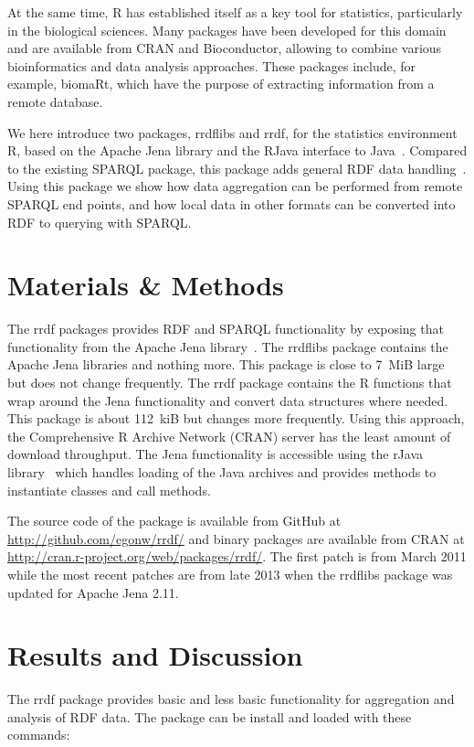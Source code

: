 \documentclass[12pt]{article}
\begin{document}
At the same time, R has established itself as a key tool for statistics, particularly in the biological
sciences. Many packages have been developed for this domain and are available from CRAN and Bioconductor,
allowing to combine various bioinformatics and data analysis approaches. These packages include,
for example, biomaRt, which have the purpose of extracting information from a remote database.

We here introduce two packages, rrdflibs and rrdf, for the statistics environment R, based on the Apache
Jena library and the RJava interface to Java~\cite{RMan,Jena,RJava}. Compared to the existing SPARQL
package, this package adds general RDF data handling~\cite{VanHage2013}. Using this package we show how
data aggregation can be performed from remote SPARQL end points, and how local data in other formats
can be converted into RDF to querying with SPARQL.

\section{Materials \& Methods}

The rrdf packages provides RDF and SPARQL functionality by exposing that functionality from the
Apache Jena library~\cite{Jena}. The rrdflibs package contains the Apache Jena libraries and
nothing more. This package is close to 7~MiB large but does not change frequently. The rrdf
package contains the R functions that wrap around the Jena functionality and convert data structures
where needed. This package is about 112~kiB but changes more frequently. Using this approach,
the Comprehensive R Archive Network (CRAN) server has the least amount of download throughput.
The Jena functionality is accessible using the rJava library~\cite{RJava} which handles loading
of the Java archives and provides methods to instantiate classes and call methods.

The source code of the package is available from GitHub at \url{http://github.com/egonw/rrdf/} and
binary packages are available from CRAN at \url{http://cran.r-project.org/web/packages/rrdf/}.
The first patch is from March 2011 while the most recent patches are from late 2013 when the
rrdflibs package was updated for Apache Jena 2.11.

\section{Results and Discussion}

The rrdf package provides basic and less basic functionality for aggregation and analysis of RDF data.
The package can be install and loaded with these commands:
\end{document}
